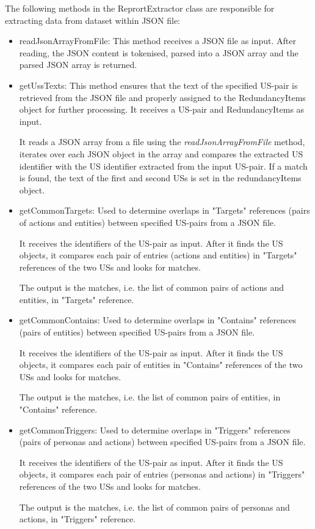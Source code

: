 The following methods in the ReprortExtractor class are responsible for extracting data from dataset within JSON file:
\begin{itemize}
	\item readJsonArrayFromFile: This method receives a JSON file as input. After reading, the JSON content is tokenised, parsed into a JSON array and the parsed JSON array is returned.
	
	\item getUssTexts: This method ensures that the text of the specified US-pair is retrieved from the JSON file and properly assigned to the RedundancyItems object for further processing. It receives a US-pair and RedundancyItems as input. 
	
	It reads a JSON array from a file using the \textit{readJsonArrayFromFile} method, iterates over each JSON object in the array and compares the extracted US identifier with the US identifier extracted from the input US-pair. If a match is found, the text of the first and second USs is set in the redundancyItems object.
	
	\item getCommonTargets: Used to determine overlaps in "Targets" references (pairs of actions and entities) between specified US-pairs from a JSON file.
	
	It receives the identifiers of the US-pair as input. After it finds the US objects, it compares each pair of entries (actions and entities) in "Targets" references of the two USs and looks for matches.
	
	The output is the matches, i.e. the list of common pairs of actions and entities, in "Targets" reference.
	
	\item getCommonContains: Used to determine overlaps in "Contains" references (pairs of entities) between specified US-pairs from a JSON file.
	
	It receives the identifiers of the US-pair as input. After it finds the US objects, it compares each pair of entities in "Contains" references of the two USs and looks for matches.
	
	The output is the matches, i.e. the list of common pairs of entities, in "Contains" reference.
	
	\item getCommonTriggers: Used to determine overlaps in "Triggers" references (pairs of personas and actions) between specified US-pairs from a JSON file.
	
	It receives the identifiers of the US-pair as input. After it finds the US objects, it compares each pair of entries (personas and actions) in "Triggers" references of the two USs and looks for matches.
	
	The output is the matches, i.e. the list of common pairs of personas and actions, in "Triggers" reference.
\end{itemize}
